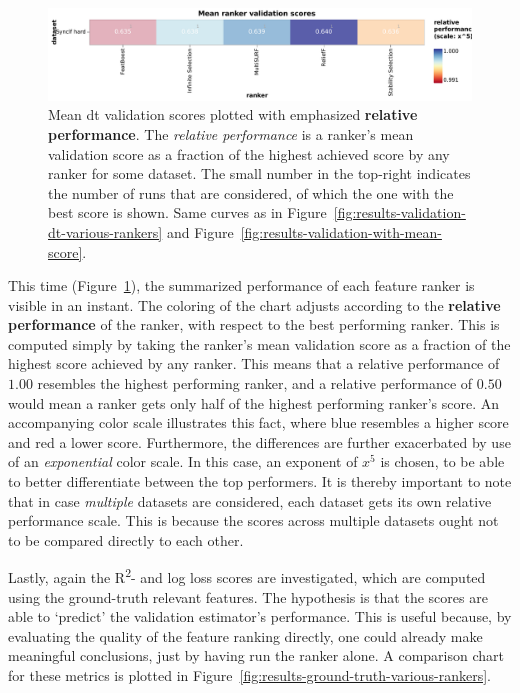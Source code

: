 \documentclass[../main.tex]{subfiles}
\begin{document}
\begin{figure}[ht]
    \centering
    \includegraphics[width=\linewidth]{report/images/results-validation-with-mean-score-tabular.pdf}
    \caption{Mean \gls{dt} validation scores plotted with emphasized \textbf{relative performance}. The \textit{relative performance} is a ranker's mean validation score as a fraction of the highest achieved score by any ranker for some dataset. The small number in the top-right indicates the number of runs that are considered, of which the one with the best score is shown. Same curves as in Figure~\ref{fig:results-validation-dt-various-rankers} and Figure~\ref{fig:results-validation-with-mean-score}.}
    \label{fig:results-validation-with-mean-score-tabular}
\end{figure}

This time (Figure~\ref{fig:results-validation-with-mean-score-tabular}), the summarized performance of each feature ranker is visible in an instant. The coloring of the chart adjusts according to the \textbf{relative performance} of the ranker, with respect to the best performing ranker. This is computed simply by taking the ranker's mean validation score as a fraction of the highest score achieved by any ranker. This means that a relative performance of $1.00$ resembles the highest performing ranker, and a relative performance of $0.50$ would mean a ranker gets only half of the highest performing ranker's score. An accompanying color scale illustrates this fact, where blue resembles a higher score and red a lower score. Furthermore, the differences are further exacerbated by use of an \textit{exponential} color scale. In this case, an exponent of $x^5$ is chosen, to be able to better differentiate between the top performers.
It is thereby important to note that in case \textit{multiple} datasets are considered, each dataset gets its own relative performance scale. This is because the scores across multiple datasets ought not to be compared directly to each other.



Lastly, again the R\textsuperscript{2}- and log loss scores are investigated, which are computed using the ground-truth relevant features. The hypothesis is that the scores are able to `predict' the validation estimator's performance. This is useful because, by evaluating the quality of the feature ranking directly, one could already make meaningful conclusions, just by having run the ranker alone. A comparison chart for these metrics is plotted in Figure~\ref{fig:results-ground-truth-various-rankers}.
\end{document}

